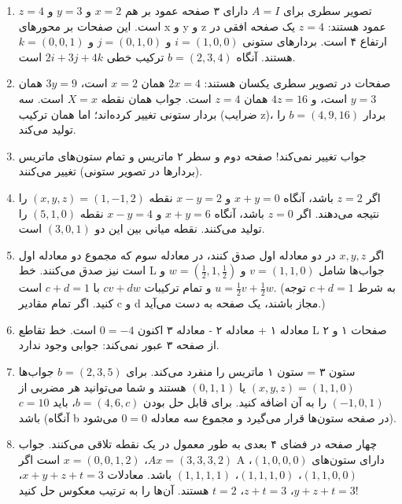 \documentclass[12pt]{article}
\begin{document}
	
	\begin{enumerate}
		\item تصویر سطری برای $A = I$ دارای ۳ صفحه عمود بر هم $x = 2$ و $y = 3$ و $z = 4$ است. این صفحات بر محورهای x و y و z عمود هستند: $z = 4$ یک صفحه افقی در ارتفاع ۴ است. بردارهای ستونی $i = (1,0,0)$ و $j = (0,1,0)$ و $k = (0,0,1)$ هستند. آنگاه $b = (2, 3,4)$ ترکیب خطی $2i + 3j + 4k$ است.
		
		\item صفحات در تصویر سطری یکسان هستند: $2x = 4$ همان $x = 2$ است، $3y = 9$ همان $y = 3$ است، و $4z = 16$ همان $z = 4$ است. جواب همان نقطه $X = x$ است. سه بردار ستونی تغییر کرده‌اند؛ اما همان ترکیب (ضرایب z)، بردار $b = (4,9,16)$ را تولید می‌کند.
		
		\item جواب تغییر نمی‌کند! صفحه دوم و سطر ۲ ماتریس و تمام ستون‌های ماتریس (بردارها در تصویر ستونی) تغییر می‌کنند.
		
		\item اگر $z = 2$ باشد، آنگاه $x+y = 0$ و $x-y = 2$ نقطه $(x,y,z) = (1,-1,2)$ را نتیجه می‌دهند. اگر $z = 0$ باشد، آنگاه $x+y = 6$ و $x-y = 4$ نقطه $(5,1,0)$ را تولید می‌کنند. نقطه میانی بین این دو $(3,0,1)$ است.
		
		\item اگر $x,y,z$ در دو معادله اول صدق کنند، در معادله سوم که مجموع دو معادله اول است نیز صدق می‌کنند. خط L جواب‌ها شامل $v = (1,1,0)$ و $w = (\frac{1}{2}, 1, \frac{1}{2})$ و $u = \frac{1}{2}v + \frac{1}{2}w$ و تمام ترکیبات $cv+dw$ با $c+d = 1$ است. (به شرط $c+d=1$ توجه کنید. اگر تمام مقادیر c و d مجاز باشند، یک صفحه به دست می‌آید.)
		
		\item معادله ۱ + معادله ۲ - معادله ۳ اکنون $0 = -4$ است. خط تقاطع L صفحات ۱ و ۲ از صفحه ۳ عبور نمی‌کند: جوابی وجود ندارد.
		
		\item ستون ۳ = ستون ۱ ماتریس را منفرد می‌کند. برای $b = (2,3,5)$ جواب‌ها $(x, y,z) = (1,1,0)$ یا $(0,1,1)$ هستند و شما می‌توانید هر مضربی از $(-1,0,1)$ را به آن اضافه کنید. برای قابل حل بودن $b = (4,6,c)$، باید $c = 10$ باشد (آنگاه b در صفحه ستون‌ها قرار می‌گیرد و مجموع سه معادله $0 = 0$ می‌شود).
		
		\item چهار صفحه در فضای ۴ بعدی به طور معمول در یک نقطه تلاقی می‌کنند. جواب $Ax = (3, 3,3,2)$، $x = (0,0,1,2)$ است اگر A دارای ستون‌های $(1,0,0,0)$، $(1,1,0,0)$، $(1,1,1,0)$، $(1,1,1,1)$ باشد. معادلات $x+y+z+t = 3$، $y+z+t = 3$، $z+t = 3$، $t = 2$ هستند. آن‌ها را به ترتیب معکوس حل کنید!
		

\end{enumerate}
\end{document}
